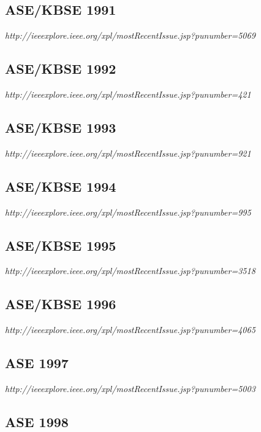 \subsection{ASE/KBSE 1991}

{\small \em http://ieeexplore.ieee.org/xpl/mostRecentIssue.jsp?punumber=5069}

\subsection{ASE/KBSE 1992}

{\small \em http://ieeexplore.ieee.org/xpl/mostRecentIssue.jsp?punumber=421}

\subsection{ASE/KBSE 1993}

{\small \em http://ieeexplore.ieee.org/xpl/mostRecentIssue.jsp?punumber=921}

\subsection{ASE/KBSE 1994}

{\small \em http://ieeexplore.ieee.org/xpl/mostRecentIssue.jsp?punumber=995}

\subsection{ASE/KBSE 1995}

{\small \em http://ieeexplore.ieee.org/xpl/mostRecentIssue.jsp?punumber=3518}

\subsection{ASE/KBSE 1996}

{\small \em http://ieeexplore.ieee.org/xpl/mostRecentIssue.jsp?punumber=4065}

\subsection{ASE 1997}

{\small \em http://ieeexplore.ieee.org/xpl/mostRecentIssue.jsp?punumber=5003}

\subsection{ASE 1998}


